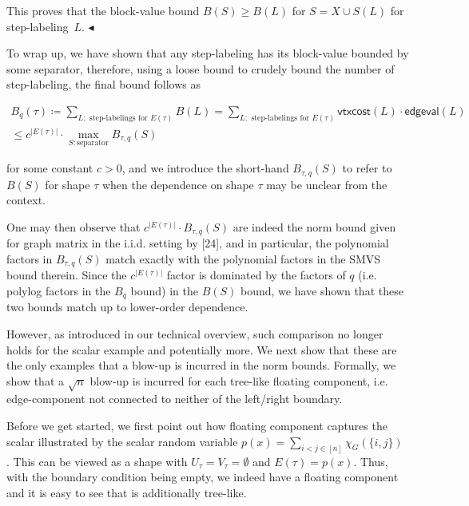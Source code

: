\documentclass[10pt,a4paper]{article}
\begin{document}
This proves that the block-value bound $B(S)\geq B(L)$ for $S=X\cup S(L)$ for step-labeling $L$. $\blacktriangleleft$\par




To wrap up, we have shown that any step-labeling has its block-value bounded by some separator, therefore, using a loose bound to crudely bound the number of step-labeling, the final bound follows as\par


\[\begin{gathered}
\displaystyle B_{q}(\tau)\coloneqq\sum_{L:\text{ step-labelings for }E(\tau)}B(L)= \displaystyle\sum_{L:\text{ step-labelings for }E(\tau)}\mathsf{vtxcost}(L)\cdot\mathsf{edgeval}(L) \\
\displaystyle\leq c^{|E(\tau)|}\cdot\max_{S:\text{separator}}B_{\tau,q}(S)
\end{gathered}\]


for some constant $c>0$, and we introduce the short-hand $B_{\tau,q}(S)$ to refer to $B(S)$ for shape $\tau$ when the dependence on shape $\tau$ may be unclear from the context.\par




One may then observe that $c^{|E(\tau)|}\cdot B_{\tau,q}(S)$ are indeed the norm bound given for graph matrix in the i.i.d. setting by [24], and in particular, the polynomial factors in $B_{\tau,q}(S)$ match exactly with the polynomial factors in the SMVS bound therein. Since the $c^{|E(\tau)|}$ factor is dominated by the factors of $q$ (i.e. polylog factors in the $B_{q}$ bound) in the $B(S)$ bound, we have shown that these two bounds match up to lower-order dependence.\par




However, as introduced in our technical overview, such comparison no longer holds for the scalar example and potentially more. We next show that these are the only examples that a blow-up is incurred in the norm bounds. Formally, we show that a $\sqrt{n}$ blow-up is incurred for each tree-like floating component, i.e. edge-component not connected to neither of the left/right boundary.\par




Before we get started, we first point out how floating component captures the scalar illustrated by the scalar random variable $p(x)=\sum_{i<j\in[n]}\chi_{G}(\{i,j\})$ . This can be viewed as a shape with $U_{\tau}=V_{\tau}=\emptyset$ and $E(\tau)=p(x)$. Thus, with the boundary condition being empty, we indeed have a floating component and it is easy to see that is additionally tree-like.\par
\end{document}
